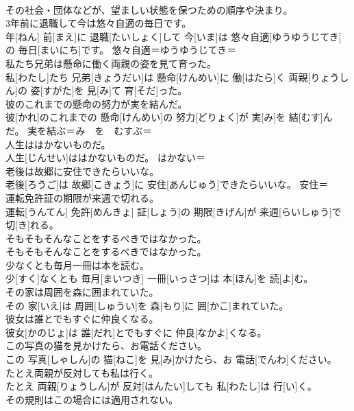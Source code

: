 \documentclass[8pt]{extreport}
\begin{document}
\begin{CJK}{UTF8}{min}
\\	その社会・団体などが、望ましい状態を保つための順序や決まり。
\\	3年前に退職して今は悠々自適の毎日です。	
\\	年[ねん] 前[まえ]に 退職[たいしょく]して 今[いま]は 悠々自適[ゆうゆうじてき]の 毎日[まいにち]です。	悠々自適＝ゆうゆうじてき＝ 
\\	私たち兄弟は懸命に働く両親の姿を見て育った。	
\\	私[わたし]たち 兄弟[きょうだい]は 懸命[けんめい]に 働[はたら]く 両親[りょうしん]の 姿[すがた]を 見[み]て 育[そだ]った。	
\\	彼のこれまでの懸命の努力が実を結んだ。	
\\	彼[かれ]のこれまでの 懸命[けんめい]の 努力[どりょく]が 実[み]を 結[むす]んだ。	実を結ぶ＝み　を　むすぶ＝ 
\\	人生ははかないものだ。	
\\	人生[じんせい]ははかないものだ。	はかない＝ 
\\	老後は故郷に安住できたらいいな。	
\\	老後[ろうご]は 故郷[こきょう]に 安住[あんじゅう]できたらいいな。	安住＝ 
\\	運転免許証の期限が来週で切れる。	
\\	運転[うんてん] 免許[めんきょ] 証[しょう]の 期限[きげん]が 来週[らいしゅう]で 切[き]れる。	
\\	そもそもそんなことをするべきではなかった。	
\\	そもそもそんなことをするべきではなかった。	
\\	少なくとも毎月一冊は本を読む。	
\\	少[すく]なくとも 毎月[まいつき] 一冊[いっさつ]は 本[ほん]を 読[よ]む。	
\\	その家は周囲を森に囲まれていた。	
\\	その 家[いえ]は 周囲[しゅうい]を 森[もり]に 囲[かこ]まれていた。	
\\	彼女は誰とでもすぐに仲良くなる。	
\\	彼女[かのじょ]は 誰[だれ]とでもすぐに 仲良[なかよ]くなる。	
\\	この写真の猫を見かけたら、お電話ください。	
\\	この 写真[しゃしん]の 猫[ねこ]を 見[み]かけたら、お 電話[でんわ]ください。	
\\	たとえ両親が反対しても私は行く。	
\\	たとえ 両親[りょうしん]が 反対[はんたい]しても 私[わたし]は 行[い]く。	
\\	その規則はこの場合には適用されない。	

\end{CJK}
\end{document}
